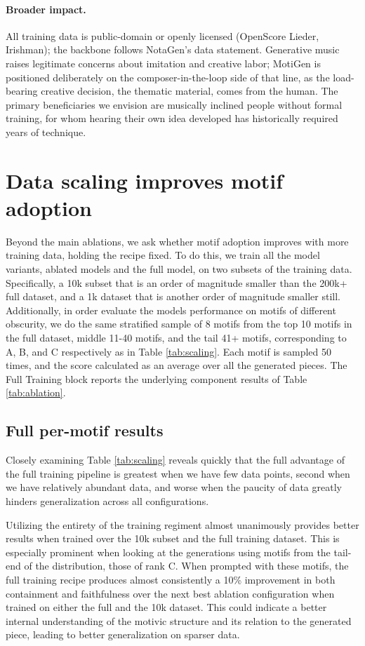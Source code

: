 \documentclass{article}
\newcommand{\method}{MotiGen}
\begin{document}
\paragraph{Broader impact.}
All training data is public-domain or openly licensed (OpenScore Lieder, Irishman); the backbone follows NotaGen's data statement. Generative music raises legitimate concerns about imitation and creative labor; \method{} is positioned deliberately on the composer-in-the-loop side of that line, as the load-bearing creative decision, the thematic material, comes from the human. The primary beneficiaries we envision are musically inclined people without formal training, for whom hearing their own idea developed has historically required years of technique.

\section{Data scaling improves motif adoption}
\label{app:scaling}

Beyond the main ablations, we ask whether motif adoption improves with more training data, holding the recipe fixed. To do this, we train all the model variants, ablated models and the full model, on two subsets of the training data. Specifically, a 10k subset that is an order of magnitude smaller than the 200k+ full dataset, and a 1k dataset that is another order of magnitude smaller still. Additionally, in order evaluate the models performance on motifs of different obscurity, we do the same stratified sample of 8 motifs from the top 10 motifs in the full dataset, middle 11-40 motifs, and the tail 41+ motifs, corresponding to A, B, and C respectively as in Table \ref{tab:scaling}. Each motif is sampled 50 times, and the score calculated as an average over all the generated pieces. The Full Training block reports the underlying component results of Table \ref{tab:ablation}.


\subsection{Full per-motif results}
\label{app:tables}

Closely examining Table \ref{tab:scaling} reveals quickly that the full advantage of the full training pipeline is greatest when we have few data points, second when we have relatively abundant data, and worse when the paucity of data greatly hinders generalization across all configurations. 

Utilizing the entirety of the training regiment almost unanimously provides better results when trained over the 10k subset and the full training dataset. This is especially prominent when looking at the generations using motifs from the tail-end of the distribution, those of rank C. When prompted with these motifs, the full training recipe produces almost consistently a 10\% improvement in both containment and faithfulness over the next best ablation configuration when trained on either the full and the 10k dataset. This could indicate a better internal understanding of the motivic structure and its relation to the generated piece, leading to better generalization on sparser data. 
\end{document}
